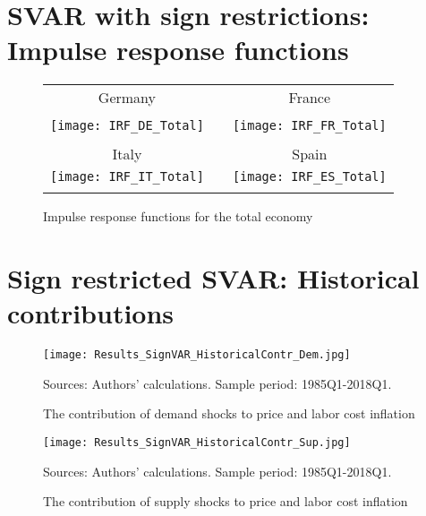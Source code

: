 \documentclass[11pt]{article}
\begin{document}
\begin{appendices}
\clearpage

\section{SVAR with sign restrictions: Impulse response functions}
\label{AppendixSVAR}

\begin{figure}[!htb]
\begin{center}
\begin{tabular}{ccc}
Germany &  & France \\
&  &  \\
\texttt{[image: IRF\_DE\_Total]} &  & %
\texttt{[image: IRF\_FR\_Total]} \\
\\
Italy &  & Spain \\
\texttt{[image: IRF\_IT\_Total]} &  & %
\texttt{[image: IRF\_ES\_Total]} \\
&  &
\end{tabular}
\caption{Impulse response functions for the total economy}
\label{fig: IRFunres}
\end{center}
\end{figure}


\clearpage


\section{Sign restricted SVAR: Historical contributions}
\label{SVARhist}


\begin{figure}[!htbp]
\begin{center}
\caption{The contribution of demand shocks to price and labor cost inflation}\label{fig:SignVAR_Hist_Demand}
\texttt{[image: Results\_SignVAR\_HistoricalContr\_Dem.jpg]}
\begin{minipage}{\textwidth} {\footnotesize
Sources: Authors' calculations.
Sample period: 1985Q1-2018Q1.\par}
\end{minipage}
\end{center}
\end{figure}


\begin{figure}[!htbp]
\begin{center}
\caption{The contribution of supply shocks to price and labor cost inflation}\label{fig:SignVAR_Hist_Supply}
\texttt{[image: Results\_SignVAR\_HistoricalContr\_Sup.jpg]}
\begin{minipage}{\textwidth} {\footnotesize
Sources: Authors' calculations.
Sample period: 1985Q1-2018Q1.\par}
\end{minipage}
\end{center}
\end{figure}



\end{appendices}
\end{document}
